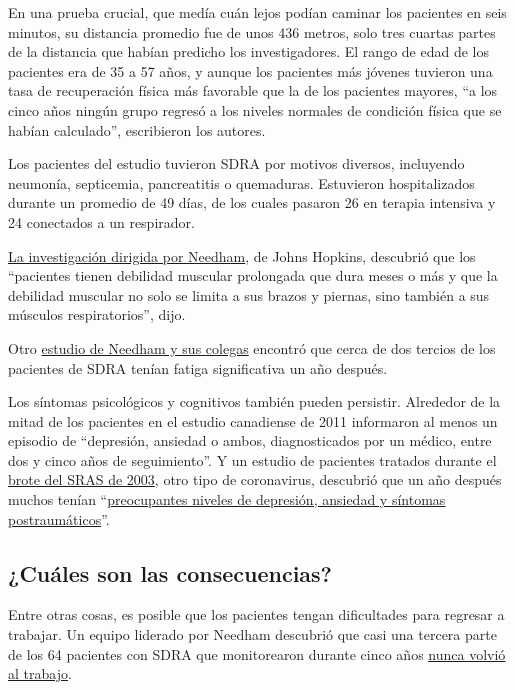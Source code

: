 En una prueba crucial, que medía cuán lejos podían caminar los pacientes
en seis minutos, su distancia promedio fue de unos 436 metros, solo tres
cuartas partes de la distancia que habían predicho los investigadores.
El rango de edad de los pacientes era de 35 a 57 años, y aunque los
pacientes más jóvenes tuvieron una tasa de recuperación física más
favorable que la de los pacientes mayores, ``a los cinco años ningún
grupo regresó a los niveles normales de condición física que se habían
calculado'', escribieron los autores.

Los pacientes del estudio tuvieron SDRA por motivos diversos, incluyendo
neumonía, septicemia, pancreatitis o quemaduras. Estuvieron
hospitalizados durante un promedio de 49 días, de los cuales pasaron 26
en terapia intensiva y 24 conectados a un respirador.

\href{https://pubmed.ncbi.nlm.nih.gov/27637716/}{La investigación
dirigida por Needham}, de Johns Hopkins, descubrió que los ``pacientes
tienen debilidad muscular prolongada que dura meses o más y que la
debilidad muscular no solo se limita a sus brazos y piernas, sino
también a sus músculos respiratorios'', dijo.

Otro \href{https://pubmed.ncbi.nlm.nih.gov/32304774/}{estudio de Needham
y sus colegas} encontró que cerca de dos tercios de los pacientes de
SDRA tenían fatiga significativa un año después.

Los síntomas psicológicos y cognitivos también pueden persistir.
Alrededor de la mitad de los pacientes en el estudio canadiense de 2011
informaron al menos un episodio de ``depresión, ansiedad o ambos,
diagnosticados por un médico, entre dos y cinco años de seguimiento''. Y
un estudio de pacientes tratados durante el
\href{https://www.who.int/mediacentre/news/releases/2003/pr56/es/}{brote
del SRAS de 2003}, otro tipo de coronavirus, descubrió que un año
después muchos tenían
``\href{https://pubmed.ncbi.nlm.nih.gov/17500304/}{preocupantes niveles
de depresión, ansiedad y síntomas postraumáticos}''.

\hypertarget{cuuxe1les-son-las-consecuencias}{%
\subsection{¿Cuáles son las
consecuencias?}\label{cuuxe1les-son-las-consecuencias}}

Entre otras cosas, es posible que los pacientes tengan dificultades para
regresar a trabajar. Un equipo liderado por Needham descubrió que casi
una tercera parte de los 64 pacientes con SDRA que monitorearon durante
cinco años
\href{https://www.ncbi.nlm.nih.gov/pmc/articles/PMC6002952/}{nunca
volvió al trabajo}.

